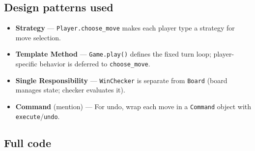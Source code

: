 \documentclass[11pt]{article}
\providecommand{\tightlist}{\setlength{\itemsep}{1pt}\setlength{\parskip}{0pt}}
\begin{document}
\subsection{Design patterns used}\label{design-patterns-used-5}

\begin{itemize}
\tightlist
\item
  \textbf{Strategy} --- \texttt{Player.choose\_move} makes each player type a strategy for move selection.
\item
  \textbf{Template Method} --- \texttt{Game.play()} defines the fixed turn loop; player-specific behavior is deferred to \texttt{choose\_move}.
\item
  \textbf{Single Responsibility} --- \texttt{WinChecker} is separate from \texttt{Board} (board manages state; checker evaluates it).
\item
  \textbf{Command} (mention) --- For undo, wrap each move in a \texttt{Command} object with \texttt{execute}/\texttt{undo}.
\end{itemize}

\subsection{Full code}\label{full-code-5}

\end{document}
